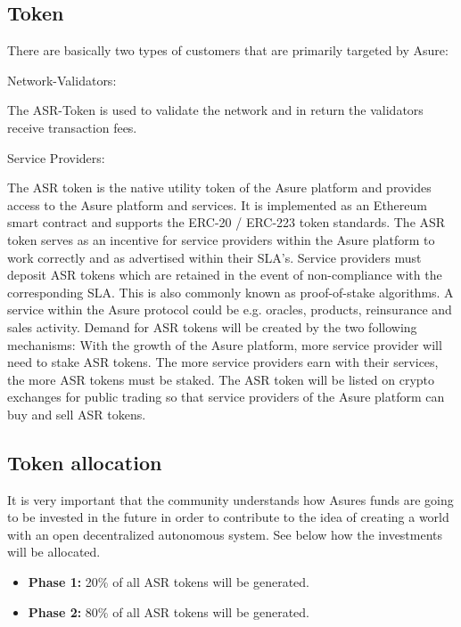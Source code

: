 \subsection{Token}

There are basically two types of customers that are primarily targeted by Asure:

Network-Validators: 

The ASR-Token is used to validate the network and in return the validators receive transaction fees.

Service Providers:

The ASR token is the native utility token of the Asure platform and provides access to the Asure platform and services. It is implemented as an Ethereum smart contract and supports the  ERC-20 / ERC-223 token standards. 
\newline
The ASR token serves as an incentive for service providers within the Asure platform to work correctly and as advertised within their SLA’s. Service providers must deposit ASR tokens which are retained in the event of non-compliance with the corresponding SLA. This is also commonly known as proof-of-stake algorithms. A service within the Asure protocol could be e.g. oracles, products, reinsurance and sales activity.\newline
Demand for ASR tokens will be created by the two following mechanisms: With the growth of the Asure platform, more service provider will need to stake ASR tokens. The more service providers earn with their services, the more ASR tokens must be staked.
The ASR token will be listed on crypto exchanges for public trading so that service providers of the Asure platform can buy and sell ASR tokens.
\newline\newline



\subsection{Token allocation}

It is very important that the community understands how Asures funds are going to be invested in the future in order to contribute to the idea of creating a world with an open decentralized autonomous system. See below how the investments will be allocated. 

\begin{itemize}
\item \textbf{Phase 1:} 20\% of all ASR tokens will be generated.
\item \textbf{Phase 2:} 80\% of all ASR tokens will be generated.
\end{itemize}

